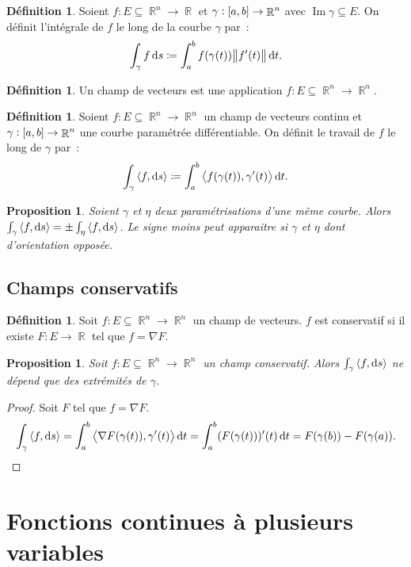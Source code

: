 \documentclass{article}
\DeclareMathOperator{\Imf}{Im}
\DeclareMathOperator{\R}{\mathbb R}
\newcommand{\scpr}[2]{{\left\langle#1, #2\right\rangle}}
\newcommand{\ab}{\interval ab}
\newtheorem{prp}[thm]{Proposition}
\theoremstyle{definition}
\newtheorem{déf}[thm]{Définition}
\theoremstyle{remark}
\begin{document}
		\begin{déf} Soient $f : E \subseteq \R^n \to \R$ et $\gamma : \ab \to \R^n$ avec $\Imf \gamma \subseteq E$. On définit l'intégrale de $f$ le
		long de la courbe $\gamma$ par~:
		\[\int_\gamma f\dif s \coloneqq \int_a^bf(\gamma(t))\norm{f'(t)}\dif t.\]
		\end{déf}

		\begin{déf} Un champ de vecteurs est une application $f : E \subseteq \R^n \to \R^n$. \end{déf}

		\begin{déf} Soient $f : E \subseteq \R^n \to \R^n$ un champ de vecteurs continu et $\gamma : \ab \to \R^n$ une courbe paramétrée différentiable.
		On définit le travail de $f$ le long de $\gamma$ par~:
		\[\int_\gamma\scpr f{\dif s} \coloneqq \int_a^b\scpr {f(\gamma(t))}{\gamma'(t)}\dif t.\]
		\end{déf}

		\begin{prp} Soient $\gamma$ et $\eta$ deux paramétrisations d'une même courbe. Alors $\int_\gamma\scpr f{\dif s} = \pm\int_\eta\scpr f{\dif s}$.
		Le signe moins peut apparaitre si $\gamma$ et $\eta$ dont d'orientation opposée. \end{prp}

	\subsection{Champs conservatifs}

		\begin{déf} Soit $f : E \subseteq \R^n \to \R^n$ un champ de vecteurs. $f$ est conservatif si il existe $F : E \to \R$ tel que $f = \nabla F$.
		\end{déf}

		\begin{prp} Soit $f : E \subseteq \R^n \to \R^n$ un champ conservatif. Alors $\int_\gamma\scpr f{\dif s}$ ne dépend que des extrémités de
		$\gamma$. \end{prp}

		\begin{proof} Soit $F$ tel que $f = \nabla F$.
		\[\int_\gamma\scpr f{\dif s} = \int_a^b\scpr {\nabla F(\gamma(t))}{\gamma'(t)}\dif t = \int_a^b(F(\gamma(t)))'(t)\dif t = F(\gamma(b))-F(\gamma(a)).\]
		\end{proof}

\newpage
\section{Fonctions continues à plusieurs variables}
\end{document}
